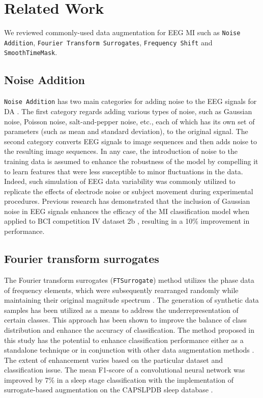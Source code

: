 \section{Related Work}
We reviewed commonly-used data augmentation for EEG MI such as \texttt{Noise Addition}, \texttt{Fourier Transform Surrogates}, \texttt{Frequency Shift} and \texttt{SmoothTimeMask}.

\subsection{Noise Addition}
\texttt{Noise Addition} has two main categories for adding noise to the EEG signals for DA \cite{lashgari2020data}.
The first category regards adding various types of noise, such as Gaussian noise, Poisson noise, salt-and-pepper noise, etc., each of which has its own set of parameters (such as mean and standard deviation), to the original signal.
The second category converts EEG signals to image sequences and then adds noise to the resulting image sequences. 
In any case, the introduction of noise to the training data is assumed to enhance the robustness of the model by compelling it to learn features that were less susceptible to minor fluctuations in the data.
Indeed, such simulation of EEG data variability was commonly utilized to replicate the effects of electrode noise or subject movement during experimental procedures.
Previous research has demonstrated that the inclusion of Gaussian noise in EEG signals enhances the efficacy of the MI classification model when applied to BCI competition IV dataset 2b \cite{brunner2008bci}, resulting in a 10\% improvement in performance.

\subsection{Fourier transform surrogates}
The Fourier transform surrogates (\texttt{FTSurrogate}) method utilizes the phase data of frequency elements, which were subsequently rearranged randomly while maintaining their original magnitude spectrum \cite{schwabedal2018addressing}.
The generation of synthetic data samples has been utilized as a means to address the underrepresentation of certain classes.
This approach has been shown to improve the balance of class distribution and enhance the accuracy of classification.
The method proposed in this study has the potential to enhance classification performance either as a standalone technique or in conjunction with other data augmentation methods \cite{schwabedal2018addressing}.
The extent of enhancement varies based on the particular dataset and classification issue.
The mean F1-score of a convolutional neural network was improved by 7\% in a sleep stage classification with the implementation of surrogate-based augmentation on the CAPSLPDB sleep database \cite{terzano2001atlas}.

